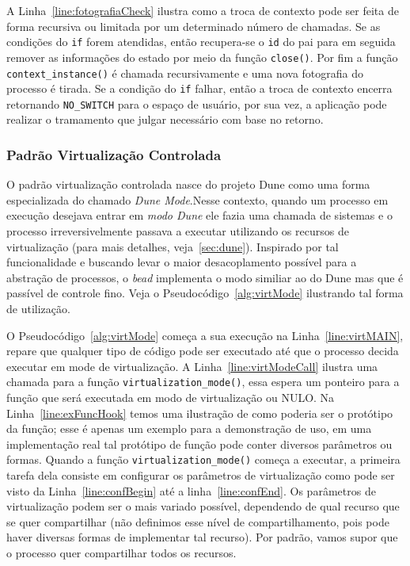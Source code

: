 A Linha~\ref{line:fotografiaCheck} ilustra como a troca de contexto pode ser
feita de forma recursiva ou limitada por um determinado número de chamadas. Se
as condições do \texttt{if} forem atendidas, então recupera-se o \texttt{id} do
pai para em seguida remover as informações do estado por meio da função
\texttt{close()}. Por fim a função \texttt{context\_instance()} é chamada
recursivamente e uma nova fotografia do processo é tirada. Se a condição do
\texttt{if} falhar, então a troca de contexto encerra retornando
\texttt{NO\_SWITCH} para o espaço de usuário, por sua vez, a aplicação pode
realizar o tramamento que julgar necessário com base no retorno.

\subsubsection{Padrão Virtualização Controlada}

O padrão virtualização controlada nasce do projeto Dune como uma forma especializada do chamado \emph{Dune Mode}.Nesse contexto, quando um processo em execução desejava entrar em \emph{modo Dune} ele fazia uma chamada de sistemas e o processo irreversivelmente passava a executar utilizando os recursos de virtualização (para mais detalhes, veja~\ref{sec:dune}). Inspirado por tal funcionalidade e buscando levar o maior desacoplamento possível para a abstração de processos, o \emph{bead} implementa o modo similiar ao do Dune mas que é passível de controle fino. Veja o Pseudocódigo~\ref{alg:virtMode} ilustrando tal forma de utilização.



O Pseudocódigo~\ref{alg:virtMode} começa a sua execução na Linha~\ref{line:virtMAIN}, repare que qualquer tipo de código pode ser executado até que o processo decida executar em mode de virtualização. A Linha~\ref{line:virtModeCall} ilustra uma chamada para a função \texttt{virtualization\_mode()}, essa espera um ponteiro para a função que será executada em modo de virtualização ou NULO. Na Linha~\ref{line:exFuncHook} temos uma ilustração de como poderia ser o protótipo da função; esse é apenas um exemplo para a demonstração de uso, em uma implementação real tal protótipo de função pode conter diversos parâmetros ou formas. Quando a função \texttt{virtualization\_mode()} começa a executar, a primeira tarefa dela consiste em configurar os parâmetros de virtualização como pode ser visto da Linha~\ref{line:confBegin} até a linha~\ref{line:confEnd}. Os parâmetros de virtualização podem ser o mais variado possível, dependendo de qual recurso que se quer compartilhar (não definimos esse nível de compartilhamento, pois pode haver diversas formas de implementar tal recurso). Por padrão, vamos supor que o processo quer compartilhar todos os recursos.

